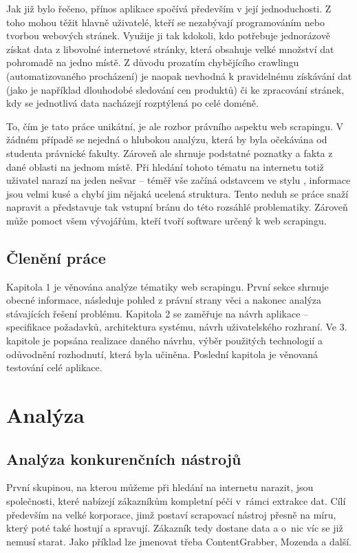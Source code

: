 \documentclass[thesis=B,czech]{FITthesis2}[2012/06/26]
\begin{document}
\begin{introduction}
		Jak již bylo řečeno, přínos aplikace spočívá především v její jednoduchosti. Z toho mohou těžit hlavně uživatelé, kteří se nezabývají programováním nebo tvorbou webových stránek. Využije ji tak kdokoli, kdo potřebuje jednorázově získat data z libovolné internetové stránky, která obsahuje velké množství dat pohromadě na jedno místě. Z důvodu prozatím chybějícího crawlingu (automatizovaného procházení) je naopak nevhodná k pravidelnému získávání dat (jako je například dlouhodobé sledování cen produktů) či ke zpracování stránek, kdy se jednotlivá data nacházejí rozptýlená po celé doméně.
		
		To, čím je tato práce unikátní, je ale rozbor právního aspektu web scrapingu. V žádném případě se nejedná o hlubokou analýzu, která by byla očekávána od studenta právnické fakulty. Zároveň ale shrnuje podstatné poznatky a fakta z dané oblasti na jednom místě. Při hledání tohoto tématu na internetu totiž uživatel narazí na jeden nešvar -- téměř vše začíná odstavcem ve stylu , informace jsou velmi kusé a chybí jim nějaká ucelená struktura. Tento neduh se práce snaží napravit a představuje tak vstupní bránu do této rozsáhlé problematiky. Zároveň může pomoct všem vývojářům, kteří tvoří software určený k web scrapingu.
		
		\section*{Členění práce}
		Kapitola 1 je věnována analýze tématiky web scrapingu. První sekce shrnuje obecné informace, následuje pohled z právní strany věci a nakonec analýza stávajících řešení problému. Kapitola 2 se zaměřuje na návrh aplikace -- specifikace požadavků, architektura systému, návrh uživatelského rozhraní. Ve 3. kapitole je popsána realizace daného návrhu, výběr použitých technologií a odůvodnění rozhodnutí, která byla učiněna. Poslední kapitola je věnovaná testování celé aplikace.
	\end{introduction}
	
	
	
	
	\chapter{Analýza}
	
	\section{Analýza konkurenčních nástrojů}
	První skupinou, na kterou můžeme při hledání na internetu narazit, jsou společnosti, které nabízejí zákazníkům kompletní péči v~rámci extrakce dat. Cílí především na velké korporace, jimž postaví scrapovací nástroj přesně na míru, který poté také hostují a spravují. Zákazník tedy dostane data a o~nic víc se již nemusí starat. Jako příklad lze jmenovat třeba ContentGrabber, Mozenda a další.
	
\end{document}
